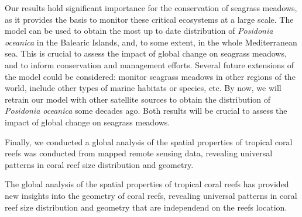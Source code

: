 Our results hold significant importance for the conservation of seagrass
meadows, as it provides the basis to monitor these critical ecosystems at a
large scale. The model can be used to obtain the most up to date distribution
of \textit{Posidonia oceanica} in the Balearic Islands, and, to some extent, in
the whole Mediterranean sea. This is crucial to assess the impact of global
change on seagrass meadows, and to inform conservation and management efforts.
Several future extensions of the model could be considered:
monitor seagrass meadows in other regions of the world, include other types of
marine habitats or species, etc. By now, we will retrain our model with other
satellite sources to obtain the distribution of \textit{Posidonia oceanica}
some decades ago. Both results will be crucial to assess the impact of global
change on seagrass meadows.

Finally, we conducted a global analysis of the spatial properties of tropical
coral reefs was conducted from mapped remote sensing data, revealing universal
patterns in coral reef size distribution and geometry.

The global analysis of the spatial properties of tropical coral reefs has
provided new insights into the geometry of coral reefs, revealing universal
patterns in coral reef size distribution and geometry that are independend on
the reefs location.



